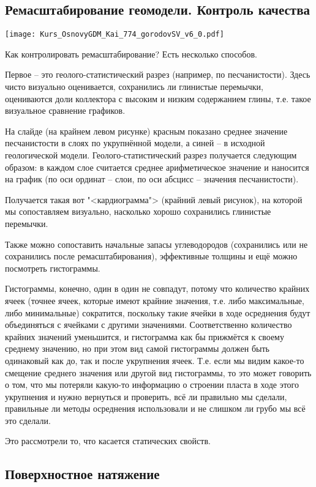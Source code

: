 \documentclass[main.tex]{subfiles}
\begin{document}
\subsection{Ремасштабирование геомодели. Контроль качества}

\texttt{[image: Kurs\_OsnovyGDM\_Kai\_774\_gorodovSV\_v6\_0.pdf]}

Как контролировать ремасштабирование?
Есть несколько способов.

Первое -- это геолого-статистический разрез (например, по песчанистости).
Здесь чисто визуально оценивается, сохранились ли глинистые перемычки, оцениваются доли коллектора с высоким и низким содержанием глины, т.е. такое визуальное сравнение графиков.

На слайде (на крайнем левом рисунке) красным показано среднее значение песчанистости в слоях по укрупнённой модели, а синей -- в исходной геологической модели.
Геолого-статистический разрез получается следующим образом: в каждом слое считается среднее арифметическое значение и наносится на график (по оси ординат -- слои, по оси абсцисс -- значения песчанистости).

Получается такая вот "<кардиограмма"> (крайний левый рисунок), на которой мы сопоставляем визуально, насколько хорошо сохранились глинистые перемычки.

Также можно сопоставить начальные запасы углеводородов (сохранились или не сохранились после ремасштабирования), эффективные толщины и ещё можно посмотреть гистограммы.

Гистограммы, конечно, один в один не совпадут, потому что количество крайних ячеек (точнее ячеек, которые имеют крайние значения, т.е. либо максимальные, либо минимальные) сократится, поскольку такие ячейки в ходе осреднения будут объединяться с ячейками с другими значениями.
Соответственно количество крайних значений уменьшится, и гистограмма как бы прижмётся к своему среднему значению, но при этом вид самой гистограммы должен быть одинаковый как до, так и после укрупнения ячеек.
Т.е. если мы видим какое-то смещение среднего значения или другой вид гистограммы, то это может говорить о том, что мы потеряли какую-то информацию о строении пласта в ходе этого укрупнения и нужно вернуться и проверить, всё ли правильно мы сделали, правильные ли методы осреднения использовали и не слишком ли грубо мы всё это сделали.

Это рассмотрели то, что касается статических свойств.

\subsection{Поверхностное натяжение}
\end{document}
